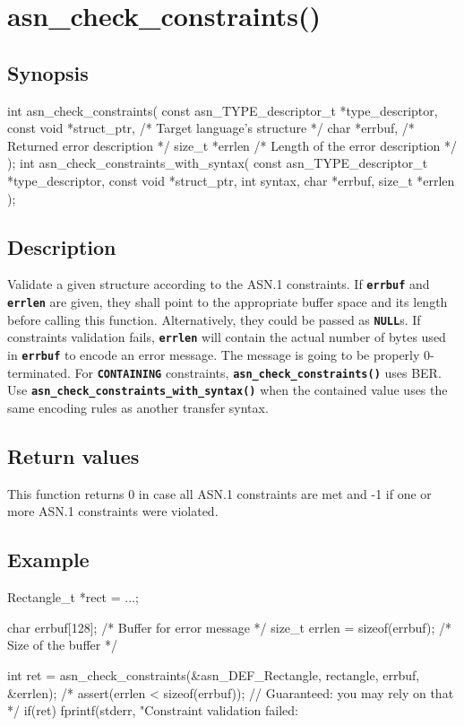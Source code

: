 \documentclass[english,oneside,12pt]{book}
\newcommand{\apisection}[2]{\clearpage\section{\label{#1}#2}}
\newcommand{\code}[1]{\texttt{\textbf{\lstinline{#1}}}}
\begin{document}
\apisection{sec:asn_check_constraints}{asn\_check\_constraints()}

\subsection*{Synopsis}

\begin{signature}
int asn_check_constraints(
    const asn_TYPE_descriptor_t *type_descriptor,
    const void *struct_ptr, /* Target language's structure */
    char *errbuf,           /* Returned error description */
    size_t *errlen          /* Length of the error description */
);
int asn_check_constraints_with_syntax(
    const asn_TYPE_descriptor_t *type_descriptor,
    const void *struct_ptr,
    int syntax, char *errbuf, size_t *errlen
);
\end{signature}

\subsection*{Description}

Validate a given structure according to the ASN.1 constraints.
If \code{errbuf} and \code{errlen} are given, they shall point to the
appropriate buffer space and its length before calling this function.
Alternatively, they could be passed as \code{NULL}s.
If constraints validation fails, \code{errlen} will contain the actual
number of bytes used in \code{errbuf} to encode an error message.
The message is going to be properly 0-terminated.
For \code{CONTAINING} constraints, \code{asn_check_constraints()} uses BER.
Use \code{asn_check_constraints_with_syntax()} when the contained value uses
the same encoding rules as another transfer syntax.

\subsection*{Return values}

This function returns 0 in case all ASN.1 constraints are met
and -1 if one or more ASN.1 constraints were violated.

\subsection*{Example}

\begin{codesample}[basicstyle=\scriptsize\listingfont,literate={-}{{\char45}}1]
Rectangle_t *rect = ...;

char errbuf[128];  /* Buffer for error message */
size_t errlen = sizeof(errbuf);  /* Size of the buffer */

int ret = asn_check_constraints(&asn_DEF_Rectangle, rectangle, errbuf, &errlen);
/* assert(errlen < sizeof(errbuf)); // Guaranteed: you may rely on that */
if(ret) {
    fprintf(stderr, "Constraint validation failed: %
}
\end{codesample}
\end{document}
